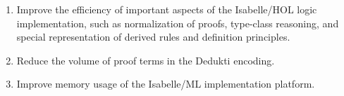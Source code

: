 


\begin{enumerate}
  \item Improve the efficiency of important aspects of the
  Isabelle/HOL logic implementation, such as normalization of proofs,
  type-class reasoning, and special representation of derived rules
  and definition principles.
  \item Reduce the volume of proof terms in the Dedukti encoding.
  \item Improve memory usage of the Isabelle/ML implementation
  platform.
\end{enumerate}
